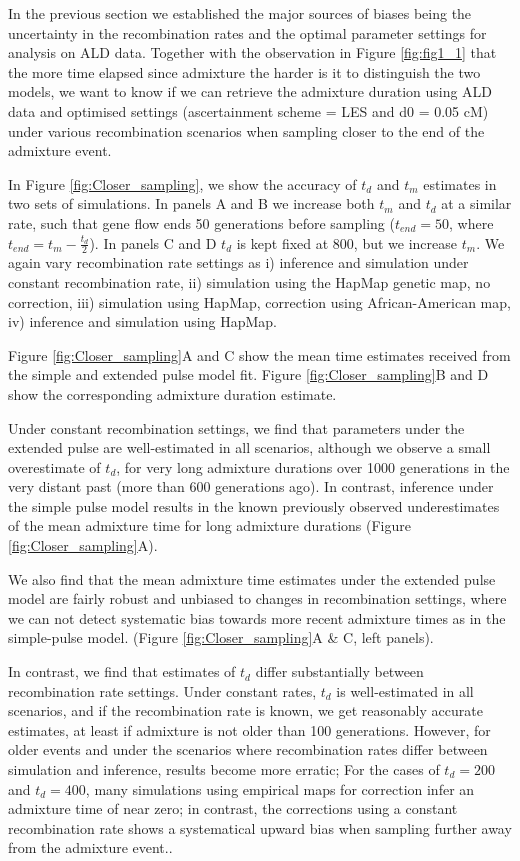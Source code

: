 \documentclass[11pt]{article}
\begin{document}
In the previous section we established the major sources of biases being the uncertainty in the recombination rates and the optimal parameter settings for analysis on ALD data. Together with the observation in Figure \ref{fig:fig1_1} that the more time elapsed since admixture the harder is it to distinguish the two models, we want to know if we can retrieve the admixture duration using ALD data and optimised settings (ascertainment scheme = LES and  d0 = 0.05 cM) under various recombination scenarios when sampling closer to the end of the admixture event.

In Figure \ref{fig:Closer_sampling}, we show the accuracy of $t_d$ and $t_m$ estimates in two sets of simulations. In panels A and B we increase both $t_m$ and $t_d$ at a similar rate, such that gene flow ends 50 generations before sampling ($t_{end}=50$, where $t_{end}= t_m - \frac{t_d}{2}$). In panels C and D $t_d$ is kept fixed at 800, but we increase $t_m$. We again vary recombination rate settings as i) inference and simulation under constant recombination rate, ii) simulation using the HapMap genetic map, no correction, iii) simulation using HapMap, correction using African-American map, iv) inference and simulation using HapMap. 

Figure \ref{fig:Closer_sampling}A and C show the mean time estimates received from the simple and extended pulse model fit. Figure \ref{fig:Closer_sampling}B and D show the corresponding admixture duration estimate. 

Under constant recombination settings, we find that parameters under the extended pulse are well-estimated in all scenarios, although we observe a small overestimate of $t_d$, for very long admixture durations over 1000 generations in the very distant past (more than 600 generations ago). In contrast, inference under the simple pulse model results in the known previously observed underestimates of the mean admixture time for long admixture durations (Figure  \ref{fig:Closer_sampling}A).

We also find that the mean admixture time estimates under the extended pulse model are fairly robust and unbiased to changes in recombination settings, where we can not detect systematic bias towards more recent admixture times as in the simple-pulse model. (Figure \ref{fig:Closer_sampling}A \& C, left panels). 

In contrast, we find that estimates of $t_d$ differ substantially between recombination rate settings. Under constant rates, $t_d$ is well-estimated in all scenarios, and if the recombination rate is known, we get reasonably accurate estimates, at least if admixture is not older than 100 generations. However, for older events and under the scenarios where recombination rates differ between simulation and inference, results become more erratic; For the cases of $t_d=200$ and $t_d=400$, many simulations using empirical maps for correction infer an admixture time of near zero; in contrast, the corrections using a constant recombination rate shows a systematical upward bias when sampling further away from the admixture event..
\end{document}
